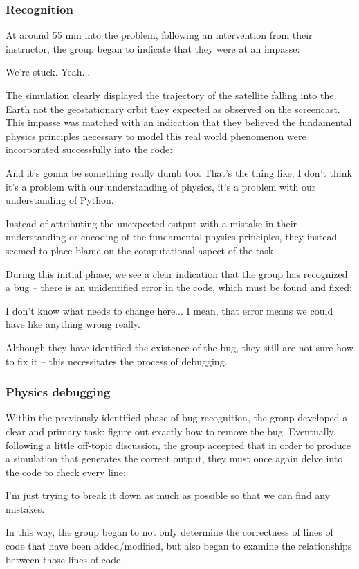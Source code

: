 \documentclass{msuphddissertation}
\begin{document}
\begin{doublespace}
\subsubsection{Recognition}

At around 55 min into the problem, following an intervention from their instructor, the group began to indicate that they were at an impasse: \begin{description}
\SB We're stuck.
\SD Yeah...\end{description} The simulation clearly displayed the trajectory of the satellite falling into the Earth not the geostationary orbit they expected as observed on the screencast. This impasse was matched with an indication that they believed the fundamental physics principles necessary to model this real world phenomenon were incorporated successfully into the code:\begin{description}
\SB And it's gonna be something really dumb too.
\SA That's the thing like, I don't think it's a problem with our understanding of physics, it's a problem with our understanding of Python.\end{description}  Instead of attributing the unexpected output with a mistake in their understanding or encoding of the fundamental physics principles, they instead seemed to place blame on the computational aspect of the task.

During this initial phase, we see a clear indication that the group has recognized a bug -- there is an unidentified error in the code, which must be found and fixed: \begin{description}
\SA I don't know what needs to change here...
\SD I mean, that {error} means we could have like anything wrong really.\end{description}  Although they have identified the existence of the bug, they still are not sure how to fix it -- this necessitates the
process of debugging.

\subsubsection{Physics debugging}

Within the previously identified phase of bug recognition, the group developed a clear and primary task: figure out exactly how to remove the bug. Eventually, following a little off-topic discussion, the group accepted that in order to produce a simulation that generates the correct output, they must once again delve into the code to check every line:\begin{description}
\SA I'm just trying to break it down as much as possible so that we can find any mistakes.\end{description}  In this way, the group began to not only determine the correctness of lines of code that have been added/modified, but also began to examine the relationships between those lines of code.


\end{doublespace}
\end{document}
